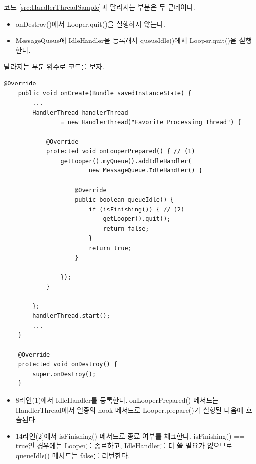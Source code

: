 코드 \ref{src:HandlerThreadSample}과 달라지는 부분은 두 군데이다.
\begin{itemize}
\item onDestroy()에서 Looper.quit()을 실행하지 않는다.
\item MessageQueue에 IdleHandler을 등록해서 queueIdle()에서 Looper.quit()을 실행한다.
\end{itemize}

달라지는 부분 위주로 코드를 보자.
\begin{lstlisting}[frame=single, caption=Handler 스레드 사용 예제(Fixed), label=src:HandlerThreadSample2] 
 	@Override
    public void onCreate(Bundle savedInstanceState) {
    	...
        HandlerThread handlerThread
                = new HandlerThread("Favorite Processing Thread") {

            @Override
            protected void onLooperPrepared() { // (1)
                getLooper().myQueue().addIdleHandler(
                		new MessageQueue.IdleHandler() {

                    @Override
                    public boolean queueIdle() {
                        if (isFinishing()) { // (2)
                            getLooper().quit();
                            return false;
                        }
                        return true;
                    }

                });
            }

        };
        handlerThread.start();
        ...
	}
	
	@Override
    protected void onDestroy() {
        super.onDestroy();
    }
\end{lstlisting}

\begin{itemize}
\item 8라인(1)에서 IdleHandler를 등록한다. onLooperPrepared() 메서드는 HandlerThread에서 일종의 hook 메서드로 Looper.prepare()가 실행된 다음에 호출된다.
\item 14라인(2)에서 isFinishing() 메서드로 종료 여부를 체크한다. isFinishing() == true인 경우에는 Looper를 종료하고, IdleHandler를 더 쓸 필요가 없으므로 queueIdle() 메서드는 false를 리턴한다.
\end{itemize}

